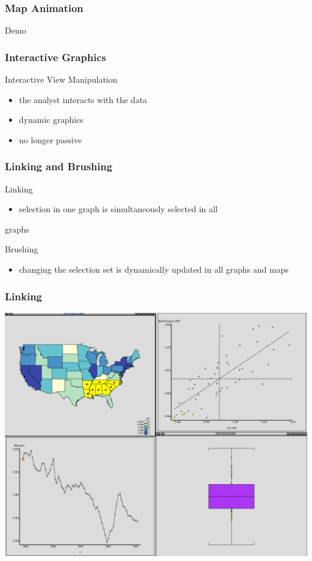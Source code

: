 \documentclass[nototal]{beamer}
\begin{document}
\begin{frame}
	\frametitle{Map Animation}
 Demo
 \end{frame} 

\begin{frame}
	\frametitle{Interactive Graphics}
 
\begin{block}{Interactive View Manipulation}
 \begin{itemize}
 \item  the analyst interacts with the data
 \item  dynamic graphics
 \item  no longer passive
 \end{itemize}
 \end{block} \end{frame} 

\begin{frame}
	\frametitle{Linking and Brushing}
 
\begin{block}{Linking}
 \begin{itemize}
 \item  selection in one graph is simultaneously selected in all
 \end{itemize}
    graphs
 \end{block} 
\begin{block}{Brushing}
 \begin{itemize}
 \item  changing the selection set is dynamically updated in all graphs and maps
 \end{itemize}
 \end{block} \end{frame} 

\begin{frame}
	\frametitle{Linking}
 \begin{center}
 \includegraphics[width=.85\linewidth]{linking.pdf}
  \end{center}
 \end{frame} 
\end{document}

